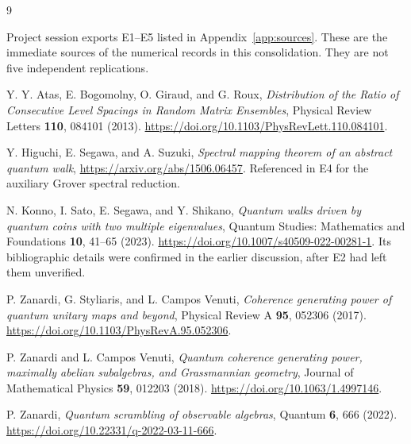 \documentclass[11pt,a4paper,oneside]{report}
\numberwithin{equation}{chapter}
\begin{document}
\clearpage
\begin{thebibliography}{9}
\raggedright
{}
Project session exports E1--E5 listed in Appendix~\ref{app:sources}.
These are the immediate sources of the numerical records in this
consolidation. They are not five independent replications.

Y. Y. Atas, E. Bogomolny, O. Giraud, and G. Roux,
\emph{Distribution of the Ratio of Consecutive Level Spacings in Random
Matrix Ensembles}, Physical Review Letters \textbf{110}, 084101 (2013).
\url{https://doi.org/10.1103/PhysRevLett.110.084101}.

Y. Higuchi, E. Segawa, and A. Suzuki,
\emph{Spectral mapping theorem of an abstract quantum walk},
\url{https://arxiv.org/abs/1506.06457}.
Referenced in E4 for the auxiliary Grover spectral reduction.

N. Konno, I. Sato, E. Segawa, and Y. Shikano,
\emph{Quantum walks driven by quantum coins with two multiple eigenvalues},
Quantum Studies: Mathematics and Foundations \textbf{10}, 41--65 (2023).
\url{https://doi.org/10.1007/s40509-022-00281-1}.
Its bibliographic details were confirmed in the earlier discussion,
after E2 had left them unverified.

P. Zanardi, G. Styliaris, and L. Campos Venuti,
\emph{Coherence generating power of quantum unitary maps and beyond},
Physical Review A \textbf{95}, 052306 (2017).
\url{https://doi.org/10.1103/PhysRevA.95.052306}.

P. Zanardi and L. Campos Venuti,
\emph{Quantum coherence generating power, maximally abelian subalgebras,
and Grassmannian geometry}, Journal of Mathematical Physics
\textbf{59}, 012203 (2018).
\url{https://doi.org/10.1063/1.4997146}.

P. Zanardi, \emph{Quantum scrambling of observable algebras},
Quantum \textbf{6}, 666 (2022).
\url{https://doi.org/10.22331/q-2022-03-11-666}.
\end{thebibliography}
\end{document}
